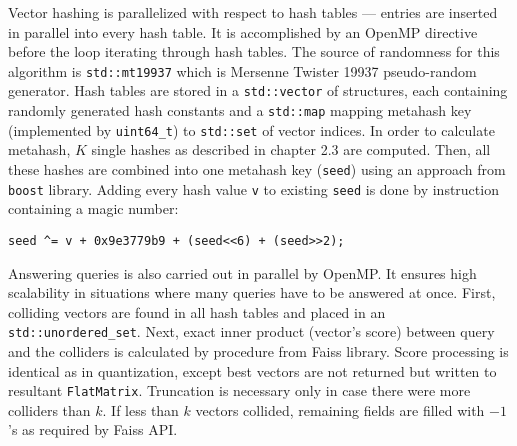 Vector hashing is parallelized with respect to hash tables --- entries are inserted in parallel
into every hash table. It is accomplished by an OpenMP directive before the loop iterating through
hash tables.
The source of randomness for this algorithm is \texttt{std::mt19937} which is Mersenne
Twister 19937 pseudo-random generator.
Hash tables are stored in a \texttt{std::vector} of structures, each containing
randomly generated hash constants and a \texttt{std::map} mapping
metahash key (implemented by \texttt{uint64\_t}) to \texttt{std::set} of vector indices.
In order to calculate metahash, $K$ single hashes as described in chapter 2.3 are computed.
Then, all these hashes are combined into one metahash key (\texttt{seed}) using an approach from
\texttt{boost} library. Adding every hash value \texttt{v} to existing \texttt{seed} is done
by instruction containing a magic number:
\begin{verbatim}
seed ^= v + 0x9e3779b9 + (seed<<6) + (seed>>2);
\end{verbatim}

Answering queries is also carried out in parallel by OpenMP. It ensures high scalability in situations
where many queries have to be answered at once. First, colliding vectors are found in all hash
tables and placed in an \texttt{std::unordered\_set}. Next, exact inner product (vector's score)
between query and the colliders is calculated by  procedure from Faiss library.
Score processing is identical as in quantization, except best vectors are not returned but
written to resultant \texttt{FlatMatrix}. Truncation is necessary only in case there were more
colliders than $k$.
If less than $k$ vectors collided, remaining fields are filled with $-1$'s as required by
Faiss API.
